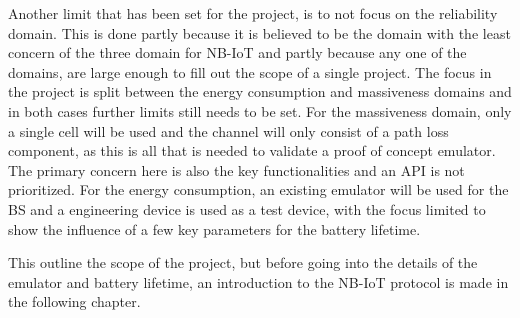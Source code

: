 Another limit that has been set for the project, is to not focus on the reliability domain. This is done partly because it is believed to be the domain with the least concern of the three domain for NB-IoT and partly because any one of the domains, are large enough to fill out the scope of a single project. The focus in the project is split between the energy consumption and massiveness domains and in both cases further limits still needs to be set. For the massiveness domain, only a single cell will be used and the channel will only consist of a path loss component, as this is all that is needed to validate a proof of concept emulator. The primary concern here is also the key functionalities and an API is not prioritized. For the energy consumption, an existing emulator will be used for the BS and a engineering device is used as a test device, with the focus limited to show the influence of a few key parameters for the battery lifetime. %

This outline the scope of the project, but before going into the details of the emulator and battery lifetime, an introduction to the \gls{NB-IoT} protocol is made in the following chapter.









 


